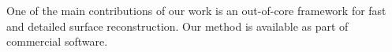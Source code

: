 \documentclass[10pt,twocolumn,letterpaper]{article}
\begin{document}
One of the main contributions of our work is an out-of-core framework for fast and detailed surface reconstruction.
\ificcvfinal Our method is available as part of commercial software.\fi

\vspace{0.2\textheight} %


\end{document}
